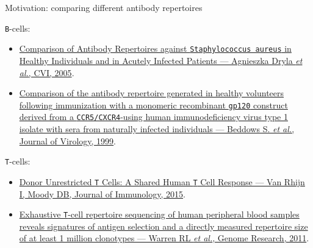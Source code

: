 \documentclass{beamer}\usepackage[]{graphicx}\usepackage[]{color}
\begin{document}
\begin{frame}{Motivation: comparing different antibody repertoires}
  \footnotesize{
  \texttt{B}-cells:
  \begin{itemize}
    \item \href{http://www.ncbi.nlm.nih.gov/pmc/articles/PMC1065207/}{Comparison of Antibody Repertoires against \texttt{Staphylococcus aureus} in 
      Healthy Individuals and in Acutely Infected Patients --- Agnieszka Dryla \textit{et al.}, CVI, 2005}.
  
    \item \href{http://www.ncbi.nlm.nih.gov/pubmed/9882391}{Comparison of the antibody repertoire generated in healthy volunteers following immunization with a monomeric recombinant \texttt{gp120} 
      construct derived from a \texttt{CCR5/CXCR4}-using human immunodeficiency virus type 1 isolate with sera from naturally infected individuals --- Beddows S. \textit{et al.}, Journal of Virology, 1999}. 
  \end{itemize}

  \bigskip
  \texttt{T}-cells:
  \begin{itemize}
    \item \href{http://www.ncbi.nlm.nih.gov/pubmed/26297792}{Donor Unrestricted \texttt{T} Cells: A Shared Human \texttt{T} Cell Response --- Van Rhijn I, Moody DB, Journal of Immunology, 2015}.
    \item \href{http://www.ncbi.nlm.nih.gov/pubmed/21349924}{Exhaustive \texttt{T}-cell repertoire sequencing of human peripheral blood samples reveals 
      signatures of antigen selection and a directly measured repertoire size of at least 1 million clonotypes --- Warren RL \textit{et al.}, Genome Research, 2011}.
  \end{itemize}
}
\end{frame}
\end{document}
